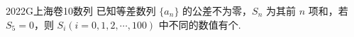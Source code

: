 
\begin{problem}{2022}{G}{上海卷}{10}{数列}
已知等差数列 $\{a_n\}$ 的公差不为零，$S_n$ 为其前 $n$ 项和，若 $S_5=0$，则 $S_i(i=0,1,2,\cdots,100)$ 中不同的数值有\underline{\hspace{4em}}个.
\end{problem}